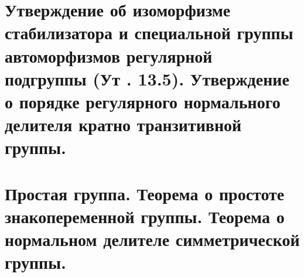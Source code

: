 \documentclass[a4paper,11pt,openany]{book}
\begin{document}
\section{Утверждение об изоморфизме стабилизатора и специальной группы автоморфизмов регулярной подгруппы (Ут . 13.5). Утверждение о порядке регулярного нормального делителя кратно транзитивной группы.}
\section{Простая группа. Теорема о простоте знакопеременной группы. Теорема о нормальном делителе симметрической группы.}
\end{document}
